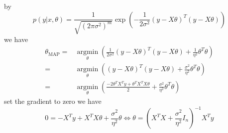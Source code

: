 \begin{answer}
	by
\begin{equation*}
p(y|x,\theta) = \frac{1}{\sqrt{(2\pi\sigma^2)^{m}}}\exp \left(-\frac{1}{2\sigma^2}(y-X\theta)^T(y-X\theta)\right)
\end{equation*}
we have
\begin{align*}
\theta_{\text{MAP}} =&\operatorname*{argmin}_{\theta}\left(\frac{1}{2\sigma^2}(y-X\theta)^T(y-X\theta)+\frac{1}{\eta^2}\theta^T\theta\right)\\
= &\operatorname*{argmin}_{\theta}\left((y-X\theta)^T(y-X\theta)+\frac{\sigma^2}{\eta^2}\theta^T\theta\right)\\
= &\operatorname*{argmin}_{\theta}\left( \frac{-2\theta^TX^Ty+\theta^TX^TX\theta}{2}+\frac{\sigma^2}{\eta^2}\theta^T\theta\right) 
\end{align*}
set the gradient to zero we have
\[ 0 = -X^Ty+X^TX\theta+\frac{\sigma^2}{\eta^2}\theta \Leftrightarrow \theta = (X^TX+\frac{\sigma^2}{\eta^2}I_{n})^{-1}X^Ty\]
\end{answer}
